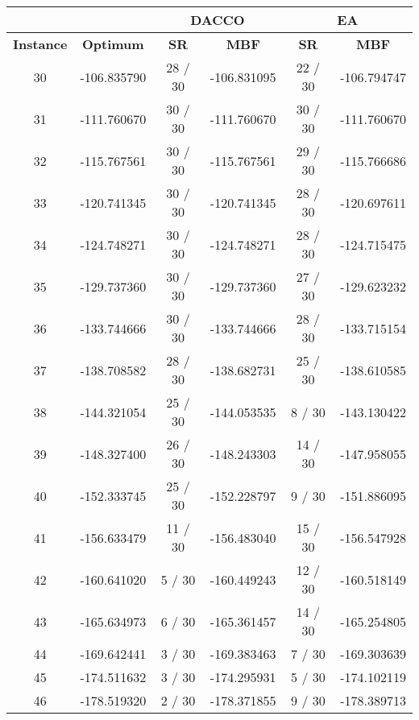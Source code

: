		\begin{table}[!htdp]
				\label{tab:dacco_vs_ea}
				\begin{center}
					\begin{tabular}{| c | c | c | c | c | c |}
						\hline
						\multicolumn{2}{|c|}{} & \multicolumn{2}{c|}{\textbf{DACCO}} & \multicolumn{2}{c|}{\textbf{EA}}\\ \hline
						\textbf{Instance} & \textbf{Optimum} & \textbf{SR} & \textbf{MBF} & \textbf{SR} & \textbf{MBF} \\ \hline
						30 & -106.835790 & 28 / 30 & -106.831095 & 22 / 30 & -106.794747 \\ \hline
						31 & -111.760670 & 30 / 30 & -111.760670 & 30 / 30 & -111.760670 \\ \hline
						32 & -115.767561 & 30 / 30 & -115.767561 & 29 / 30 & -115.766686 \\ \hline
						33 & -120.741345 & 30 / 30 & -120.741345 & 28 / 30 & -120.697611 \\ \hline
						34 & -124.748271 & 30 / 30 & -124.748271 & 28 / 30 & -124.715475 \\ \hline
						35 & -129.737360 & 30 / 30 & -129.737360 & 27 / 30 & -129.623232 \\ \hline
						36 & -133.744666 & 30 / 30 & -133.744666 & 28 / 30 & -133.715154 \\ \hline
						37 & -138.708582 & 28 / 30 & -138.682731 & 25 / 30 & -138.610585 \\ \hline
						38 & -144.321054 & 25 / 30 & -144.053535 & 8 / 30 & -143.130422 \\ \hline
						39 & -148.327400 & 26 / 30 & -148.243303 & 14 / 30 & -147.958055 \\ \hline
						40 & -152.333745 & 25 / 30 & -152.228797 & 9 / 30 & -151.886095 \\ \hline
						41 & -156.633479 & 11 / 30 & -156.483040 & 15 / 30 & -156.547928 \\ \hline
						42 & -160.641020 & 5 / 30 & -160.449243 & 12 / 30 & -160.518149 \\ \hline
						43 & -165.634973 & 6 / 30 & -165.361457 & 14 / 30 & -165.254805 \\ \hline
						44 & -169.642441 & 3 / 30 & -169.383463 & 7 / 30 & -169.303639 \\ \hline
						45 & -174.511632 & 3 / 30 & -174.295931 & 5 / 30 & -174.102119 \\ \hline
						46 & -178.519320 & 2 / 30 & -178.371855 & 9 / 30 & -178.389713 \\ \hline

\end{tabular}
\end{center}
\end{table}
